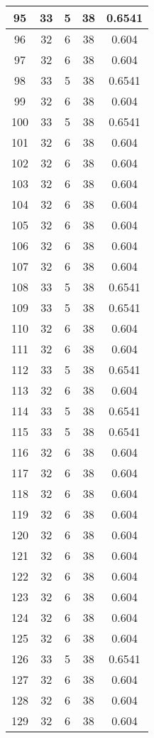 \documentclass[letterpaper, 12pt]{article}
\begin{document}
\begin{longtable}{|c|c|c|c|c|}
95 & 33 & 5 & 38 & 0.6541 \\
\hline
96 & 32 & 6 & 38 & 0.604 \\
\hline
97 & 32 & 6 & 38 & 0.604 \\
\hline
98 & 33 & 5 & 38 & 0.6541 \\
\hline
99 & 32 & 6 & 38 & 0.604 \\
\hline
100 & 33 & 5 & 38 & 0.6541 \\
\hline
101 & 32 & 6 & 38 & 0.604 \\
\hline
102 & 32 & 6 & 38 & 0.604 \\
\hline
103 & 32 & 6 & 38 & 0.604 \\
\hline
104 & 32 & 6 & 38 & 0.604 \\
\hline
105 & 32 & 6 & 38 & 0.604 \\
\hline
106 & 32 & 6 & 38 & 0.604 \\
\hline
107 & 32 & 6 & 38 & 0.604 \\
\hline
108 & 33 & 5 & 38 & 0.6541 \\
\hline
109 & 33 & 5 & 38 & 0.6541 \\
\hline
110 & 32 & 6 & 38 & 0.604 \\
\hline
111 & 32 & 6 & 38 & 0.604 \\
\hline
112 & 33 & 5 & 38 & 0.6541 \\
\hline
113 & 32 & 6 & 38 & 0.604 \\
\hline
114 & 33 & 5 & 38 & 0.6541 \\
\hline
115 & 33 & 5 & 38 & 0.6541 \\
\hline
116 & 32 & 6 & 38 & 0.604 \\
\hline
117 & 32 & 6 & 38 & 0.604 \\
\hline
118 & 32 & 6 & 38 & 0.604 \\
\hline
119 & 32 & 6 & 38 & 0.604 \\
\hline
120 & 32 & 6 & 38 & 0.604 \\
\hline
121 & 32 & 6 & 38 & 0.604 \\
\hline
122 & 32 & 6 & 38 & 0.604 \\
\hline
123 & 32 & 6 & 38 & 0.604 \\
\hline
124 & 32 & 6 & 38 & 0.604 \\
\hline
125 & 32 & 6 & 38 & 0.604 \\
\hline
126 & 33 & 5 & 38 & 0.6541 \\
\hline
127 & 32 & 6 & 38 & 0.604 \\
\hline
128 & 32 & 6 & 38 & 0.604 \\
\hline
129 & 32 & 6 & 38 & 0.604 \\

\end{longtable}
\end{document}
